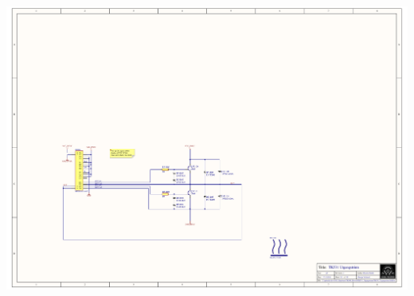 \includegraphics[page=7,height=\textheight,width=\textwidth,keepaspectratio]{TK531_Utgangstrinn.PDF}
%

